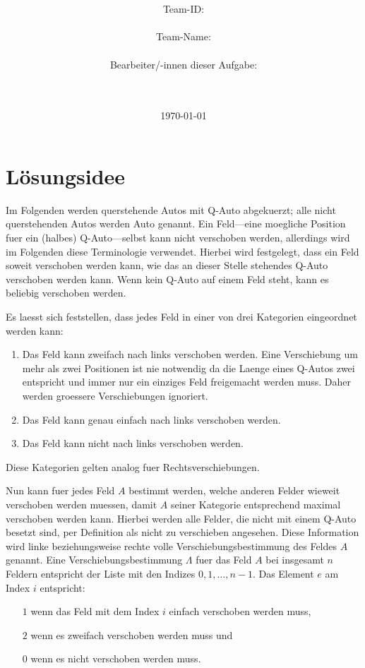 \documentclass[a4paper,10pt,ngerman]{scrartcl}
\title{\textbf{\Huge\Aufgabe}}
\author{\LARGE Team-ID: \LARGE \TeamId \\\\
	    \LARGE Team-Name: \LARGE \TeamName \\\\
	    \LARGE Bearbeiter/-innen dieser Aufgabe: \\ 
	    \LARGE \Namen\\\\}
\date{\LARGE\today}
\begin{document}
\maketitle
\tableofcontents

\vspace{0.5cm}

\section{Lösungsidee}
Im Folgenden werden querstehende Autos mit \glqq{}Q-Auto\grqq{} abgekuerzt; alle nicht querstehenden Autos werden \glqq{}Auto\grqq{} genannt.
Ein Feld---eine moegliche Position fuer ein (halbes) Q-Auto---selbst kann nicht verschoben werden, allerdings wird im Folgenden diese Terminologie verwendet.
Hierbei wird festgelegt, dass ein Feld soweit verschoben werden kann, wie das an dieser Stelle stehendes Q-Auto verschoben werden kann.
Wenn kein Q-Auto auf einem Feld steht, kann es beliebig verschoben werden.

Es laesst sich feststellen, dass jedes Feld in einer von drei Kategorien eingeordnet werden kann:
\begin{enumerate}
    \item Das Feld kann zweifach nach links verschoben werden.
          Eine Verschiebung um mehr als zwei Positionen ist nie notwendig da die Laenge eines Q-Autos zwei entspricht und immer nur ein einziges Feld freigemacht werden muss.
          Daher werden groessere Verschiebungen ignoriert.
    \item Das Feld kann genau einfach nach links verschoben werden.
    \item Das Feld kann nicht nach links verschoben werden.
\end{enumerate}
Diese Kategorien gelten analog fuer Rechtsverschiebungen.

Nun kann fuer jedes Feld $A$ bestimmt werden, welche anderen Felder wieweit verschoben werden muessen, damit $A$ seiner Kategorie entsprechend maximal verschoben werden kann.
Hierbei werden alle Felder, die nicht mit einem Q-Auto besetzt sind, per Definition als nicht zu verschieben angesehen.
Diese Information wird linke beziehungsweise rechte volle Verschiebungsbestimmung des Feldes $A$ genannt.
Eine Verschiebungsbestimmung $\Lambda$ fuer das Feld $A$ bei insgesamt $n$ Feldern entspricht der Liste mit den Indizes $0,1,\dots,n-1$.
Das Element $e$ am Index $i$ entspricht:
\begin{itemize}
    \item[$1$] wenn das Feld mit dem Index $i$ einfach verschoben werden muss,
    \item[$2$] wenn es zweifach verschoben werden muss und
    \item[$0$] wenn es nicht verschoben werden muss.
\end{itemize}
\end{document}
